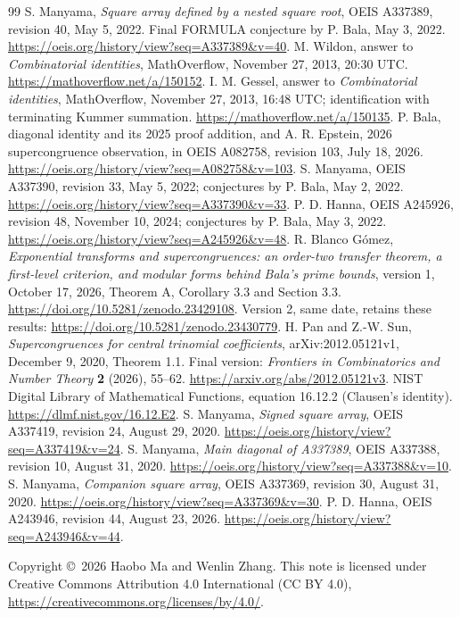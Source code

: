 \documentclass[11pt]{article}
\begin{document}
\begin{thebibliography}{99}\small
{} S. Manyama, \emph{Square array defined by a nested
square root}, OEIS A337389, revision 40, May 5, 2022.
Final FORMULA conjecture by P. Bala, May 3, 2022.
\url{https://oeis.org/history/view?seq=A337389&v=40}.
 M. Wildon, answer to \emph{Combinatorial identities},
MathOverflow, November 27, 2013, 20:30 UTC.
\url{https://mathoverflow.net/a/150152}.
 I. M. Gessel, answer to \emph{Combinatorial identities},
MathOverflow, November 27, 2013, 16:48 UTC; identification with
terminating Kummer summation.
\url{https://mathoverflow.net/a/150135}.
 P. Bala, diagonal identity and its 2025 proof
addition, and A. R. Epstein, 2026 supercongruence observation,
in OEIS A082758, revision 103, July 18, 2026.
\url{https://oeis.org/history/view?seq=A082758&v=103}.
 S. Manyama, OEIS A337390, revision 33,
May 5, 2022; conjectures by P. Bala, May 2, 2022.
\url{https://oeis.org/history/view?seq=A337390&v=33}.
 P. D. Hanna, OEIS A245926, revision 48,
November 10, 2024; conjectures by P. Bala, May 3, 2022.
\url{https://oeis.org/history/view?seq=A245926&v=48}.
 R. Blanco G\'omez, \emph{Exponential transforms and
supercongruences: an order-two transfer theorem, a first-level criterion,
and modular forms behind Bala's prime bounds}, version 1,
October 17, 2026, Theorem A, Corollary 3.3 and Section 3.3.
\url{https://doi.org/10.5281/zenodo.23429108}.
Version 2, same date, retains these results:
\url{https://doi.org/10.5281/zenodo.23430779}.
 H. Pan and Z.-W. Sun, \emph{Supercongruences for
central trinomial coefficients}, arXiv:2012.05121v1, December 9, 2020,
Theorem 1.1. Final version: \emph{Frontiers in Combinatorics and
Number Theory} \textbf{2} (2026), 55--62.
\url{https://arxiv.org/abs/2012.05121v3}.
 NIST Digital Library of Mathematical Functions,
equation 16.12.2 (Clausen's identity).
\url{https://dlmf.nist.gov/16.12.E2}.
 S. Manyama, \emph{Signed square array},
OEIS A337419, revision 24, August 29, 2020.
\url{https://oeis.org/history/view?seq=A337419&v=24}.
 S. Manyama, \emph{Main diagonal of A337389},
OEIS A337388, revision 10, August 31, 2020.
\url{https://oeis.org/history/view?seq=A337388&v=10}.
 S. Manyama, \emph{Companion square array},
OEIS A337369, revision 30, August 31, 2020.
\url{https://oeis.org/history/view?seq=A337369&v=30}.
 P. D. Hanna, OEIS A243946, revision 44,
August 23, 2026.
\url{https://oeis.org/history/view?seq=A243946&v=44}.
\end{thebibliography}
\medskip
\noindent\small Copyright \copyright\ 2026 Haobo Ma and Wenlin Zhang.
This note is licensed under Creative Commons Attribution 4.0 International
(CC BY 4.0), \url{https://creativecommons.org/licenses/by/4.0/}.
\end{document}
